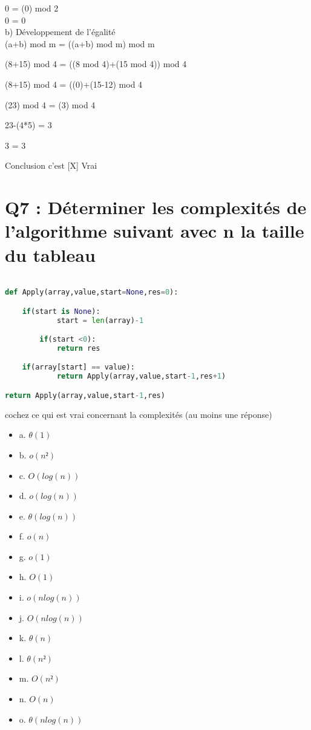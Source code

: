 0 = (0) mod 2 \\

0 = 0 \\

b) Développement de l'égalité \\

(a+b) mod m = ((a+b) mod m) mod m

(8+15) mod 4 = ((8 mod 4)+(15 mod 4)) mod 4

(8+15) mod 4 = ((0)+(15-12) mod 4

(23) mod 4 = (3) mod 4

23-(4*5) = 3

3 = 3

\vspace{4mm} %

Conclusion c'est [X] Vrai \\


\newpage
\section{Q7 : Déterminer les complexités de l’algorithme suivant avec n la taille du tableau}

\vspace{5mm} %

\begin{lstlisting}[language=Python, caption=Python algorithme]

def Apply(array,value,start=None,res=0):

	if(start is None):
            start = len(array)-1

        if(start <0):
            return res

	if(array[start] == value):
            return Apply(array,value,start-1,res+1)

return Apply(array,value,start-1,res)
\end{lstlisting}

\vspace{5mm} %

cochez ce qui est vrai concernant la complexités (au moins une réponse)\\
\begin{itemize}[label=$\square$]
\item {a. $\theta(1)$}
\item {b. $o(n²)$}
\item {c. $O(log(n))$}
\item {d. $o(log(n))$}
\item {e. $\theta(log(n))$}
\item {f. $o(n)$}
\item {g. $o(1)$}
\item {h. $O(1)$}
\item {i. $o(n log(n))$}
\item {j. $O(n log(n))$}
\item {k. $\theta(n)$}
\item {l. $\theta(n²)$}
\item {m. $O(n²)$}
\item {n. $O(n)$}
\item {o. $\theta(n log(n))$}
\end{itemize}

